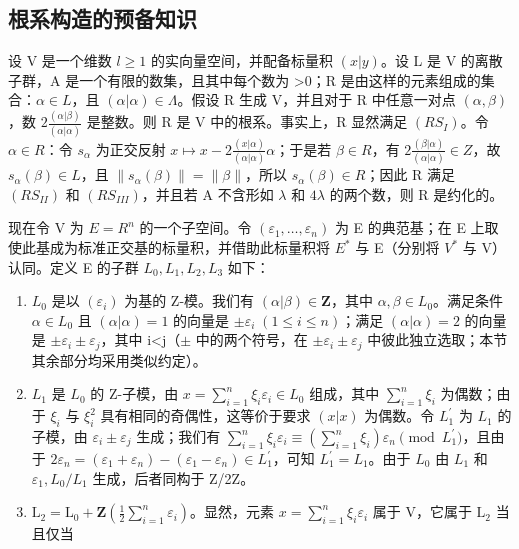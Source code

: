 \subsection{根系构造的预备知识}

设 V 是一个维数 \(l \geqslant 1\) 的实向量空间，并配备标量积 \((x|y)\)。设 L 是 V 的离散子群，A 是一个有限的数集，且其中每个数为 \textgreater0；R 是由这样的元素组成的集合：\(\alpha \in L\)，且 \((\alpha|\alpha) \in \Lambda\)。假设 R 生成 V，并且对于 R 中任意一对点 \((\alpha,\beta)\)，数 \(2\frac{(\alpha|\beta)}{(\alpha|\alpha)}\) 是整数。则 R 是 V 中的根系。事实上，R 显然满足 \((RS_{I})\)。令 \(\alpha \in R\)：令 \(s_{\alpha}\) 为正交反射 \(x \mapsto x - 2\frac{(x|\alpha)}{(\alpha|\alpha)}\alpha\)；于是若 \(\beta \in R\)，有 \(2\frac{(\beta|\alpha)}{(\alpha|\alpha)} \in Z\)，故 \(s_{\alpha}(\beta) \in L\)，且 \(\|s_{\alpha}(\beta)\| = \| \beta \|\)，所以 \(s_{\alpha}(\beta) \in R\)；因此 R 满足 \((RS_{II})\) 和 \((RS_{III})\)，并且若 A 不含形如 \(\lambda\) 和 \(4\lambda\) 的两个数，则 R 是约化的。

现在令 V 为 \(E = R^{n}\) 的一个子空间。令 \((\varepsilon_{1}, \ldots, \varepsilon_{n})\) 为 E 的典范基；在 E 上取使此基成为标准正交基的标量积，并借助此标量积将 \(E^{*}\) 与 E（分别将 \(V^{*}\) 与 V）认同。定义 E 的子群 \(L_{0}, L_{1}, L_{2}, L_{3}\) 如下：

\begin{enumerate}
\def\labelenumi{\arabic{enumi})}
\item
  \(L_{0}\) 是以 \((\varepsilon_{i})\) 为基的 Z-模。我们有 \((\alpha|\beta)\in\mathbf{Z}\)，其中 \(\alpha,\beta\in L_{0}\)。满足条件 \(\alpha\in L_{0}\) 且 \((\alpha|\alpha)=1\) 的向量是 \(\pm\varepsilon_{i}\;(1\leqslant i\leqslant n)\)；满足 \((\alpha|\alpha)=2\) 的向量是 \(\pm\varepsilon_{i}\pm\varepsilon_{j}\)，其中 i\textless j（\(\pm\) 中的两个符号，在 \(\pm\varepsilon_{i}\pm\varepsilon_{j}\) 中彼此独立选取；本节其余部分均采用类似约定）。
\item
  \(L_{1}\) 是 \(L_{0}\) 的 Z-子模，由 \(x = \sum_{i=1}^{n} \xi_{i} \varepsilon_{i} \in L_{0}\) 组成，其中 \(\sum_{i=1}^{n} \xi_{i}\) 为偶数；由于 \(\xi_{i}\) 与 \(\xi_{i}^{2}\) 具有相同的奇偶性，这等价于要求 \((x|x)\) 为偶数。令 \(L_{1}^{\prime}\) 为 \(L_{1}\) 的子模，由 \(\varepsilon_{i} \pm \varepsilon_{j}\) 生成；我们有 \(\sum_{i=1}^{n} \xi_{i} \varepsilon_{i} \equiv (\sum_{i=1}^{n} \xi_{i}) \varepsilon_{n} \pmod{L_{1}^{\prime}}\)，且由于 \(2\varepsilon_{n} = (\varepsilon_{1} + \varepsilon_{n}) - (\varepsilon_{1} - \varepsilon_{n}) \in L_{1}^{\prime}\)，可知 \(L_{1}^{\prime} = L_{1}\)。由于 \(L_{0}\) 由 \(L_{1}\) 和 \(\varepsilon_{1}, L_{0}/L_{1}\) 生成，后者同构于 Z/2Z。
\item
  \(\mathrm{L}_2 = \mathrm{L}_0 + \mathbf{Z}\left(\frac{1}{2} \sum_{i=1}^{n} \varepsilon_i\right)\)。显然，元素 \(x = \sum_{i=1}^{n} \xi_i \varepsilon_i\) 属于 \(\mathrm{V}\)，它属于 \(\mathrm{L}_2\) 当且仅当
\end{enumerate}

